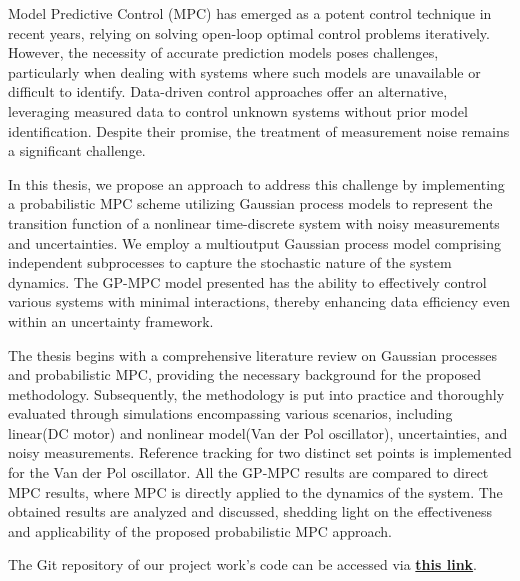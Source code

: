 



Model Predictive Control (MPC) has emerged as a potent control technique in recent years, relying on solving open-loop optimal control problems iteratively. However, the necessity of accurate prediction models poses challenges, particularly when dealing with systems where such models are unavailable or difficult to identify. Data-driven control approaches offer an alternative, leveraging measured data to control unknown systems without prior model identification. Despite their promise, the treatment of measurement noise remains a significant challenge.

In this thesis, we propose an approach to address this challenge by implementing a probabilistic MPC scheme utilizing Gaussian process models to represent the transition function of a nonlinear time-discrete system with noisy measurements and uncertainties. We employ a multioutput Gaussian process model comprising independent subprocesses to capture the stochastic nature of the system dynamics. The GP-MPC model presented has the ability to effectively control various systems with minimal interactions, thereby enhancing data efficiency even within an uncertainty framework.

The thesis begins with a comprehensive literature review on Gaussian processes and probabilistic MPC, providing the necessary background for the proposed methodology. Subsequently, the methodology is put into practice and thoroughly evaluated through simulations encompassing various scenarios, including linear(DC motor) and nonlinear model(Van der Pol oscillator), uncertainties, and noisy measurements. Reference tracking for two distinct set points is implemented for the Van der Pol oscillator. All the GP-MPC results are compared to direct MPC results, where MPC is directly applied to the dynamics of the system. The obtained results are analyzed and discussed, shedding light on the effectiveness and applicability of the proposed probabilistic MPC approach. 

The Git repository of our project work's code can be accessed via  \href{https://collaborating.tuhh.de/ICS/ics-private/students/student-repos/PA_Harshith_Gowda}{\textbf{this link}}.